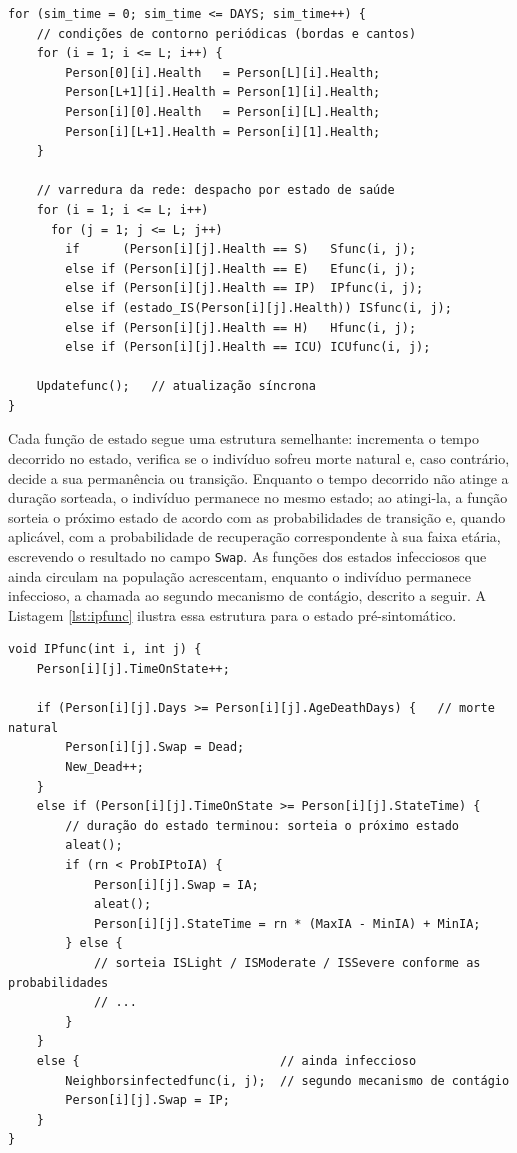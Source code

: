 \begin{lstlisting}[caption={Laço principal: contorno periódico, varredura e atualização.}, label={lst:loop}]
for (sim_time = 0; sim_time <= DAYS; sim_time++) {
    // condições de contorno periódicas (bordas e cantos)
    for (i = 1; i <= L; i++) {
        Person[0][i].Health   = Person[L][i].Health;
        Person[L+1][i].Health = Person[1][i].Health;
        Person[i][0].Health   = Person[i][L].Health;
        Person[i][L+1].Health = Person[i][1].Health;
    }

    // varredura da rede: despacho por estado de saúde
    for (i = 1; i <= L; i++)
      for (j = 1; j <= L; j++)
        if      (Person[i][j].Health == S)   Sfunc(i, j);
        else if (Person[i][j].Health == E)   Efunc(i, j);
        else if (Person[i][j].Health == IP)  IPfunc(i, j);
        else if (estado_IS(Person[i][j].Health)) ISfunc(i, j);
        else if (Person[i][j].Health == H)   Hfunc(i, j);
        else if (Person[i][j].Health == ICU) ICUfunc(i, j);

    Updatefunc();   // atualização síncrona
}
\end{lstlisting}

Cada função de estado segue uma estrutura semelhante: incrementa o tempo decorrido no estado, verifica se o indivíduo sofreu morte natural e, caso contrário, decide a sua permanência ou transição. Enquanto o tempo decorrido não atinge a duração sorteada, o indivíduo permanece no mesmo estado; ao atingi-la, a função sorteia o próximo estado de acordo com as probabilidades de transição e, quando aplicável, com a probabilidade de recuperação correspondente à sua faixa etária, escrevendo o resultado no campo \texttt{Swap}. As funções dos estados infecciosos que ainda circulam na população acrescentam, enquanto o indivíduo permanece infeccioso, a chamada ao segundo mecanismo de contágio, descrito a seguir. A Listagem \ref{lst:ipfunc} ilustra essa estrutura para o estado pré-sintomático.

\begin{lstlisting}[caption={Função de estado do pré-sintomático (\texttt{IPfunc}).}, label={lst:ipfunc}]
void IPfunc(int i, int j) {
    Person[i][j].TimeOnState++;

    if (Person[i][j].Days >= Person[i][j].AgeDeathDays) {   // morte natural
        Person[i][j].Swap = Dead;
        New_Dead++;
    }
    else if (Person[i][j].TimeOnState >= Person[i][j].StateTime) {
        // duração do estado terminou: sorteia o próximo estado
        aleat();
        if (rn < ProbIPtoIA) {
            Person[i][j].Swap = IA;
            aleat();
            Person[i][j].StateTime = rn * (MaxIA - MinIA) + MinIA;
        } else {
            // sorteia ISLight / ISModerate / ISSevere conforme as probabilidades
            // ...
        }
    }
    else {                            // ainda infeccioso
        Neighborsinfectedfunc(i, j);  // segundo mecanismo de contágio
        Person[i][j].Swap = IP;
    }
}
\end{lstlisting}


